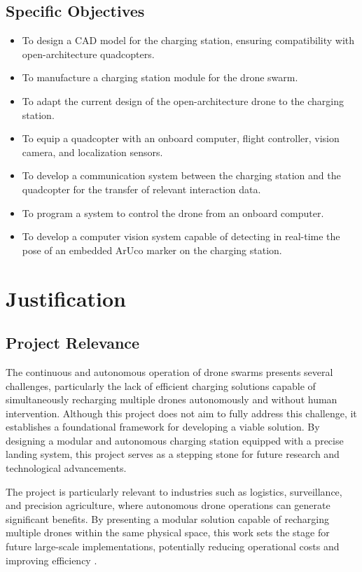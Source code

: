 \subsection{Specific Objectives}

\begin{itemize}
    \item To design a CAD model for the charging station, ensuring compatibility with open-architecture quadcopters.
    \item To manufacture a charging station module for the drone swarm.
    \item To adapt the current design of the open-architecture drone to the charging station.
    \item To equip a quadcopter with an onboard computer, flight controller, vision camera, and localization sensors.
    \item To develop a communication system between the charging station and the quadcopter for the transfer of relevant interaction data.
    \item To program a system to control the drone from an onboard computer.
    \item To develop a computer vision system capable of detecting in real-time the pose of an embedded ArUco marker on the charging station.
\end{itemize}

\section{Justification}

\subsection{Project Relevance}

The continuous and autonomous operation of drone swarms presents several challenges, particularly the lack of efficient charging solutions capable of simultaneously recharging multiple drones autonomously and without human intervention. Although this project does not aim to fully address this challenge, it establishes a foundational framework for developing a viable solution. By designing a modular and autonomous charging station equipped with a precise landing system, this project serves as a stepping stone for future research and technological advancements.

The project is particularly relevant to industries such as logistics, surveillance, and precision agriculture, where autonomous drone operations can generate significant benefits. By presenting a modular solution capable of recharging multiple drones within the same physical space, this work sets the stage for future large-scale implementations, potentially reducing operational costs and improving efficiency \cite{marek2023}. 

